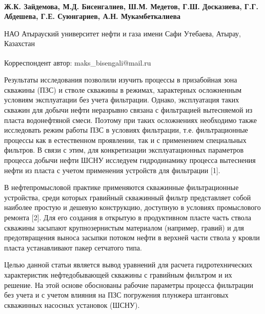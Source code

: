 
\begin{articleheader}

{\bfseries
Ж.К. Зайдемова,
М.Д. Бисенгалиев\textsuperscript{\envelope },
Ш.М. Медетов,
Г.Ш. Досказиева,
Г.Г. Абдешева,
Г.Е. Суюнгариев,
А.Н. Мукамбеткалиева
}
\end{articleheader}

\begin{affiliation}
НАО Атырауский университет нефти и газа имени Сафи Утебаева, Атырау, Казахстан

\raggedright \textsuperscript{\envelope } Корреспондент автор: maks\_bisengali@mail.ru
\end{affiliation}

Результаты исследования позволили изучить процессы в призабойная зона
скважины (ПЗС) и стволе скважины в режимах, характерных осложненным
условиям эксплуатации без учета фильтрации. Однако, эксплуатация таких
скважин для добычи нефти неразрывно связана с фильтрацией вытесняемой из
пласта водонефтяной смеси. Поэтому при таких осложнениях необходимо
также исследовать режим работы ПЗС в условиях фильтрации, т.е.
фильтрационные процессы как в естественном проявлении, так и с
применением специальных фильтров. В связи с этим, для конкретизации
эксплуатационных параметров процесса добычи нефти ШСНУ исследуем
гидродинамику процесса вытеснения нефти из пласта с учетом применения
устройств для фильтрации {[}1{]}.

В нефтепромысловой практике применяются скважинные фильтрационные
устройства, среди которых гравийный скважинный фильтр представляет собой
наиболее простую и дешевую конструкцию, доступную в условиях
промыслового ремонта {[}2{]}. Для его создания в открытую в продуктивном
пласте часть ствола скважины засыпают крупнозернистым материалом
(например, гравий) и для предотвращения выноса засыпки потоком нефти в
верхней части ствола у кровли пласта устанавливают пакер сетчатого типа.

Целью данной статьи является вывод уравнений для расчета
гидротехнических характеристик нефтедобывающей скважины с гравийным
фильтром и их решение. На этой основе обоснованы рабочие параметры
процесса фильтрации без учета и с учетом влияния на ПЗС погружения
плунжера штанговых скважинных насосных установок (ШСНУ).

